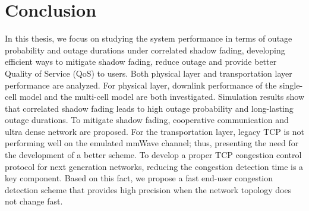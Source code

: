 \chapter{Conclusion}\label{ch:6}
 \par In this thesis, we focus on studying the system performance in terms of outage probability and outage durations under correlated shadow fading, developing efficient ways to mitigate shadow fading, reduce outage and provide better Quality of Service (QoS) to users. Both physical layer and transportation layer performance are analyzed. For physical layer, downlink performance of the single-cell model and the multi-cell model are both investigated. Simulation results show that correlated shadow fading leads to high outage probability and long-lasting outage durations. To mitigate shadow fading, cooperative communication and ultra dense network are proposed. For the transportation layer, legacy TCP is not performing well on the emulated mmWave channel; thus, presenting the need for the development of a better scheme. To develop a proper TCP congestion control protocol for next generation networks, reducing the congestion detection time is a key component. Based on this fact, we propose a fast end-user congestion detection scheme that provides high precision when the network topology does not change fast.
